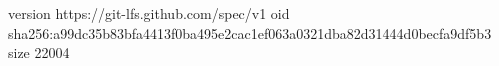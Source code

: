 version https://git-lfs.github.com/spec/v1
oid sha256:a99dc35b83bfa4413f0ba495e2cac1ef063a0321dba82d31444d0becfa9df5b3
size 22004
